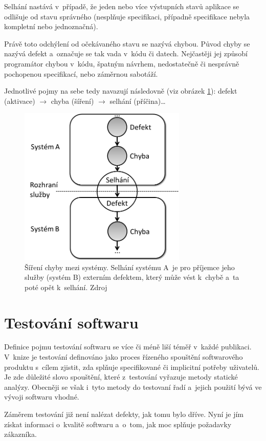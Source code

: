 	Selhání nastává v~případě, že jeden nebo více výstupních stavů aplikace se odlišuje od stavu správného (nesplňuje specifikaci, případně specifikace nebyla kompletní nebo jednoznačná).
	
	Právě toto odchýlení od očekávaného stavu se nazývá chybou. Původ chyby se nazývá defekt a~označuje se tak vada v~kódu či datech. Nejčastěji jej způsobí programátor chybou v~kódu, špatným návrhem, nedostatečně či nesprávně pochopenou specifikací, nebo záměrnou sabotáží.
	
	Jednotlivé pojmy na sebe tedy navazují následovně (viz obrázek \ref{Bug}): defekt (aktivace) $\to$ chyba (šíření) $\to$ selhání (příčina)\dots
	\begin{figure}[ht!]
		\centering
		\caption{Šíření chyby mezi systémy. Selhání systému A~je pro příjemce jeho služby (systém B) externím defektem, který může vést k~chybě a~ta poté opět  k~selhání. Zdroj \citep{RizeniKvalitySW}}
		\label{Bug}
		\includegraphics[width=8cm]{img/Bug.png}
	\end{figure}
	
	\section{Testování softwaru}
	Definice pojmu testování softwaru se více či méně liší téměř v~každé publikaci. V~knize \citep{RizeniKvalitySW} je testování definováno jako proces řízeného spouštění softwarového produktu s~cílem zjistit, zda splňuje specifikované či implicitní potřeby uživatelů. Je zde důležité slovo spouštění, které z~testování vyřazuje metody statické analýzy. Obecněji se však i~tyto metody do testovaní řadí a~jejich použití bývá ve vývoji softwaru vhodné.
	
	Záměrem testování již není nalézat defekty, jak tomu bylo dříve. Nyní je jím získat informaci o~kvalitě softwaru a~o~tom, jak moc splňuje požadavky zákazníka.
	
